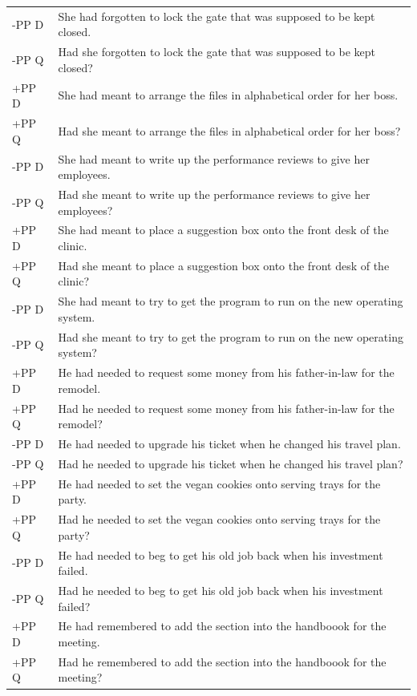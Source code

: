 \documentclass[12pt,oneside]{book}
\begin{document}
\begin{longtable}{ll}
\addlinespace
-PP D & She had forgotten to lock the gate that was supposed to be kept closed.\\
-PP Q & Had she forgotten to lock the gate that was supposed to be kept closed?\\
\addlinespace
+PP D & She had meant to arrange the files in alphabetical order for her boss.\\
+PP Q & Had she meant to arrange the files in alphabetical order for her boss?\\
\addlinespace
-PP D & She had meant to write up the performance reviews to give her employees.\\
-PP Q & Had she meant to write up the performance reviews to give her employees?\\
\addlinespace
+PP D & She had meant to place a suggestion box onto the front desk of the clinic.\\
+PP Q & Had she meant to place a suggestion box onto the front desk of the clinic?\\
\addlinespace
-PP D & She had meant to try to get the program to run on the new operating system.\\
-PP Q & Had she meant to try to get the program to run on the new operating system?\\
\addlinespace
+PP D & He had needed to request some money from his father-in-law for the remodel.\\
+PP Q & Had he needed to request some money from his father-in-law for the remodel?\\
\addlinespace
-PP D & He had needed to upgrade his ticket when he changed his travel plan.\\
-PP Q & Had he needed to upgrade his ticket when he changed his travel plan?\\
\addlinespace
+PP D & He had needed to set the vegan cookies onto serving trays for the party.\\
+PP Q & Had he needed to set the vegan cookies onto serving trays for the party?\\
\addlinespace
-PP D & He had needed to beg to get his old job back when his investment failed.\\
-PP Q & Had he needed to beg to get his old job back when his investment failed?\\
\addlinespace
+PP D & He had remembered to add the section into the handboook for the meeting.\\
+PP Q & Had he remembered to add the section into the handboook for the meeting?\\

\end{longtable}
\end{document}
